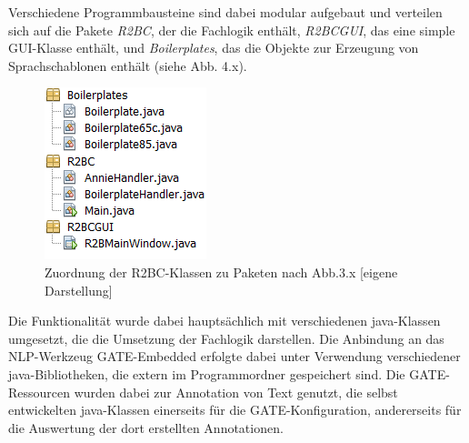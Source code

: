 \documentclass[12pt]{report}
\begin{document}
Verschiedene Programmbausteine sind dabei modular aufgebaut und verteilen sich auf die Pakete \textit{R2BC}, der die Fachlogik enthält, \textit{R2BCGUI}, das eine simple GUI-Klasse enthält, und \textit{Boilerplates}, das die Objekte zur Erzeugung von Sprachschablonen enthält (siehe Abb. 4.x).

\begin{figure}[h!]
\begin{center}
\includegraphics[scale=1.0]{Bilder/R2BC-Pakete.png}
\caption{Zuordnung der R2BC-Klassen zu Paketen nach Abb.3.x [eigene Darstellung]}
\end{center}
\end{figure}

Die Funktionalität wurde dabei hauptsächlich mit verschiedenen java-Klassen umgesetzt, die die Umsetzung der Fachlogik darstellen. Die Anbindung an das NLP-Werkzeug GATE-Embedded erfolgte dabei unter Verwendung verschiedener java-Bibliotheken, die extern im Programmordner gespeichert sind. Die GATE-Ressourcen wurden dabei zur Annotation von Text genutzt, die selbst entwickelten java-Klassen einerseits für die GATE-Konfiguration, andererseits für die Auswertung der dort erstellten Annotationen. 
\end{document}
